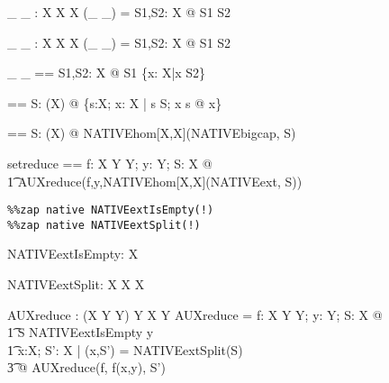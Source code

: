 \documentclass{article}
\begin{document}


\begin{axdef}[X]
   \_ \cup \_ : \assumed \power X \cross \power X \fun \power X
\where
   (\_  \cup \_)  = \lambda S1,S2: \assumed \power X @ S1 \cup S2 
\end{axdef}
\begin{axdef}[X]
   \_ \cap \_ : \assumed \power X \cross \power X \fun \power X
\where
   (\_  \cap \_)  = \lambda S1,S2: \assumed \power X @ S1 \cap S2 \\
\end{axdef}
\begin{axdef}[X]
   \_  \setminus \_  == \lambda S1,S2: \assumed \power X @ 
                           S1 \cap \{x: \assumed X|\lnot x \in S2\} \\
\end{axdef}
\begin{axdef}[X]
   \bigcup == \lambda S: \assumed \power(\power X) @ 
               \{s:\assumed \power X; x: \assumed X | s \in S; x \in s @ x\}
\end{axdef}
\begin{axdef}[X]
   \bigcap == \lambda S: \assumed \power(\power X) @ 
                       NATIVEhom[\power X,\power X](NATIVEbigcap, S)
\end{axdef}


\begin{axdef}[X,Y]
  setreduce == \lambda f: \assumed X \cross Y \pfun Y; y: \assumed Y;
                    S: \assumed \power X @ \\\t1
              AUXreduce(f,y,NATIVEhom[X,\power X](NATIVEext, S))
\end{axdef}



\begin{verbatim}
%%zap native NATIVEextIsEmpty(!)
%%zap native NATIVEextSplit(!)
\end{verbatim}

\begin{axdef}[X]
  NATIVEextIsEmpty: \assumed \power X
\end{axdef}

\begin{axdef}[X]
  NATIVEextSplit: \assumed \power X \fun X \cross \power X
\end{axdef}

\begin{axdef}[X,Y]
  AUXreduce : \assumed (X \cross Y \pfun Y) \cross Y \cross \power X
                    \pfun Y
\where
  AUXreduce = \lambda f: \assumed X \cross Y \pfun Y; y: \assumed Y;
                    S: \assumed \power X @ \\\t1
     \IF S \in NATIVEextIsEmpty \THEN y \\\t1
     \ELSE \mu x:\assumed X; S': \assumed \power X | 
                                         (x,S') = NATIVEextSplit(S) \\\t3
           @ AUXreduce(f, f(x,y), S')
\end{axdef}
\end{document}
